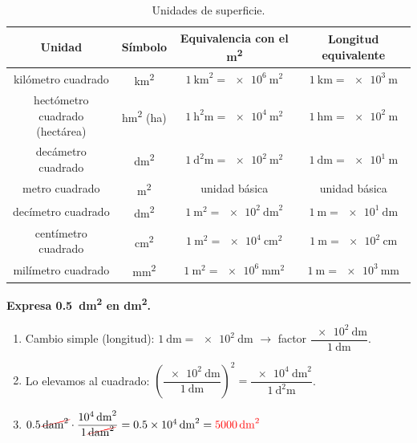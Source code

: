 \begin{table}[H]
    \centering
    \small
    \renewcommand{\arraystretch}{1.3}
    \begin{tabular}{cccc}
        \toprule
        \textbf{Unidad} & \textbf{Símbolo} & \textbf{Equivalencia con el \unit{\square\m}} & \textbf{Longitud equivalente} \\
        \midrule
        kilómetro cuadrado & \unit{\square\km} & \(\qty{1}{\square\km} = \qty{e6}{\square\m}\) & \(\qty{1}{\km} = \qty{e3}{\m}\) \\
        hectómetro cuadrado (hectárea) & \unit{\square\hecto\m} (\unit{\hectare}) & \(\qty{1}{\square\hecto\m} = \qty{e4}{\square\m}\) & \(\qty{1}{\hecto\m} = \qty{e2}{\m}\) \\
        decámetro cuadrado & \unit{\square\deca\m} & \(\qty{1}{\square\deca\m} = \qty{e2}{\square\m}\) & \(\qty{1}{\deca\m} = \qty{e1}{\m}\) \\
        \midrule
        metro cuadrado & \unit{\square\m} & unidad básica & unidad básica \\
        \midrule
        decímetro cuadrado & \unit{\square\dm} & \(\qty{1}{\square\m} = \qty{e2}{\square\dm}\) & \(\qty{1}{\m} = \qty{e1}{\dm}\) \\
        centímetro cuadrado & \unit{\square\cm} & \(\qty{1}{\square\m} = \qty{e4}{\square\cm}\) & \(\qty{1}{\m} = \qty{e2}{\cm}\) \\
        milímetro cuadrado & \unit{\square\mm} & \(\qty{1}{\square\m} = \qty{e6}{\square\mm}\) & \(\qty{1}{\m} = \qty{e3}{\mm}\) \\
        \bottomrule
    \end{tabular}
    \caption{Unidades de superficie.}
    \label{tab:u1_surface_units}
\end{table}

\begin{example}
    \textbf{Expresa \qty{0.5}{\square\deca\metre} en \unit{\square\dm}.}
    \begin{enumerate}[label=\numberballmDarkTeal]
        \item Cambio simple (longitud): \(\qty{1}{\deca\m} = \qty{e2}{\dm}\) \(\to\) factor \(\dfrac{\qty{e2}{\dm}}{\qty{1}{\deca\m}}\).
        \item Lo elevamos al cuadrado: \(\left(\dfrac{\qty{e2}{\dm}}{\qty{1}{\deca\m}}\right)^{2} = \dfrac{\qty{e4}{\square\dm}}{\qty{1}{\square\deca\m}}\).
        \item \(
            \num{0.5}\,\cancelunit{\square\deca\m} \cdot \dfrac{\qty{e4}{\square\dm}}{1\,\cancelunit{\square\deca\m}} = \qty{0.5e4}{\square\dm} = \textcolor{red}{\qty{5000}{\square\dm}}
        \)
    \end{enumerate}
\end{example}

